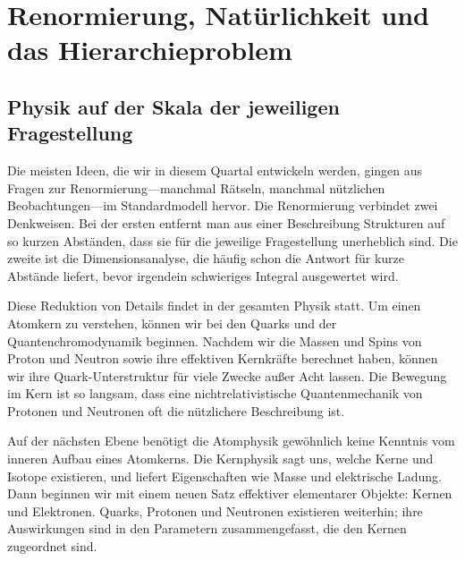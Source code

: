 \chapter{Renormierung, Natürlichkeit und das Hierarchieproblem}


\section{Physik auf der Skala der jeweiligen Fragestellung}

Die meisten Ideen, die wir in diesem Quartal entwickeln werden, gingen aus Fragen zur Renormierung---manchmal Rätseln, manchmal nützlichen Beobachtungen---im Standardmodell hervor. Die Renormierung verbindet zwei Denkweisen. Bei der ersten entfernt man aus einer Beschreibung Strukturen auf so kurzen Abständen, dass sie für die jeweilige Fragestellung unerheblich sind. Die zweite ist die Dimensionsanalyse, die häufig schon die Antwort für kurze Abstände liefert, bevor irgendein schwieriges Integral ausgewertet wird.

Diese Reduktion von Details findet in der gesamten Physik statt. Um einen Atomkern zu verstehen, können wir bei den Quarks und der Quantenchromodynamik beginnen. Nachdem wir die Massen und Spins von Proton und Neutron sowie ihre effektiven Kernkräfte berechnet haben, können wir ihre Quark-Unterstruktur für viele Zwecke außer Acht lassen. Die Bewegung im Kern ist so langsam, dass eine nichtrelativistische Quantenmechanik von Protonen und Neutronen oft die nützlichere Beschreibung ist.

Auf der nächsten Ebene benötigt die Atomphysik gewöhnlich keine Kenntnis vom inneren Aufbau eines Atomkerns. Die Kernphysik sagt uns, welche Kerne und Isotope existieren, und liefert Eigenschaften wie Masse und elektrische Ladung. Dann beginnen wir mit einem neuen Satz effektiver elementarer Objekte: Kernen und Elektronen. Quarks, Protonen und Neutronen existieren weiterhin; ihre Auswirkungen sind in den Parametern zusammengefasst, die den Kernen zugeordnet sind.

